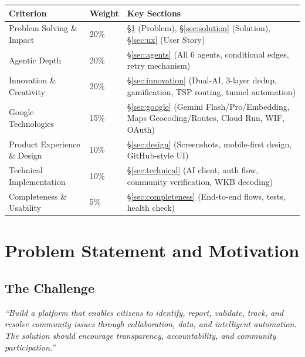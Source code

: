 \documentclass[11pt,a4paper]{article}
\newcommand{\thead}[1]{{\color{white}\bfseries\sffamily #1}}
\begin{document}
\vspace{6pt}
\begin{tabularx}{\linewidth}{@{} L{4.5cm} C{1.8cm} X @{}}
\toprule
{}
\thead{Criterion} & \thead{Weight} & \thead{Key Sections} \\
\midrule
Problem Solving \& Impact   & 20\% & §\ref{sec:problem} (Problem), §\ref{sec:solution} (Solution), §\ref{sec:ux} (User Story) \\
Agentic Depth               & 20\% & §\ref{sec:agents} (All 6 agents, conditional edges, retry mechanism) \\
Innovation \& Creativity    & 20\% & §\ref{sec:innovation} (Dual-AI, 3-layer dedup, gamification, TSP routing, tunnel automation) \\
Google Technologies         & 15\% & §\ref{sec:google} (Gemini Flash/Pro/Embedding, Maps Geocoding/Routes, Cloud Run, WIF, OAuth) \\
Product Experience \& Design& 10\% & §\ref{sec:design} (Screenshots, mobile-first design, GitHub-style UI) \\
Technical Implementation    & 10\% & §\ref{sec:technical} (AI client, auth flow, community verification, WKB decoding) \\
Completeness \& Usability   & 5\%  & §\ref{sec:completeness} (End-to-end flows, tests, health check) \\
\bottomrule
\end{tabularx}

\clearpage

\section{Problem Statement and Motivation}
\label{sec:problem}

\subsection{The Challenge}

\begin{mdframed}[linecolor=cpblue!40, linewidth=0.6pt, innerleftmargin=10pt, innerrightmargin=10pt,
  innertopmargin=6pt, innerbottommargin=6pt, backgroundcolor=cplight]
\textit{``Build a platform that enables citizens to identify, report, validate, track, and resolve community issues through collaboration, data, and intelligent automation. The solution should encourage transparency, accountability, and community participation.''}
\end{mdframed}
\end{document}
